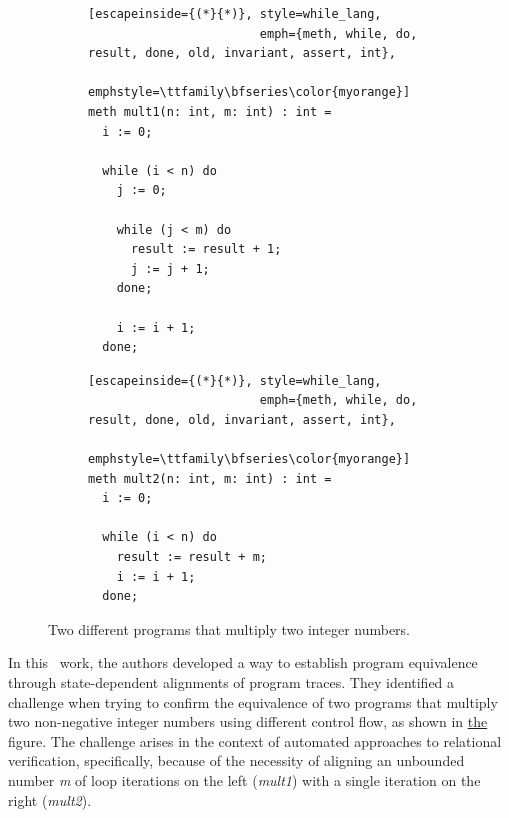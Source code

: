 \begin{figure}[h]
  \centering

  \begin{subfigure}[t]{0.49\textwidth}
    \centering
    \noindent
    \begin{lstlisting}[escapeinside={(*}{*)}, style=while_lang,
                        emph={meth, while, do, result, done, old, invariant, assert, int},
                        emphstyle=\ttfamily\bfseries\color{myorange}]
meth mult1(n: int, m: int) : int =
  i := 0;

  while (i < n) do
    j := 0;

    while (j < m) do
      result := result + 1;
      j := j + 1;
    done;

    i := i + 1;
  done;
    \end{lstlisting}
  \end{subfigure}
  \hfill
  \begin{subfigure}[t]{0.49\textwidth}
    \centering
    \noindent
    \begin{lstlisting}[escapeinside={(*}{*)}, style=while_lang,
                        emph={meth, while, do, result, done, old, invariant, assert, int},
                        emphstyle=\ttfamily\bfseries\color{myorange}]
meth mult2(n: int, m: int) : int =
  i := 0;

  while (i < n) do
    result := result + m;
    i := i + 1;
  done;
    \end{lstlisting}
  \end{subfigure}

  \caption{Two different programs that multiply two integer numbers.}
  \label{fig:mult_source_programs}
\end{figure}

In this~\cite{DBLP:conf/pldi/ChurchillP0A19} work, the authors developed a way to establish program equivalence through state-dependent alignments of program traces.
They identified a challenge when trying to confirm the equivalence of two programs that multiply two non-negative integer numbers using different control flow, as shown in \hyperref[fig:mult_source_programs]{the} figure.
The challenge arises in the context of automated approaches to relational verification, specifically, because of the necessity of aligning an unbounded number \emph{m} of loop iterations on the left (\emph{mult1}) with a single iteration on the right (\emph{mult2}).

